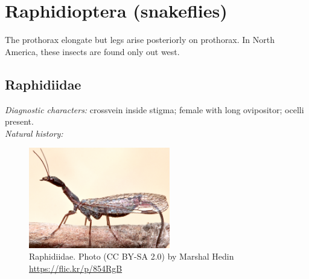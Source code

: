 \documentclass[letterpaper, 11pt]{article}
\begin{document}
\section{Raphidioptera (snakeflies)}
The prothorax elongate but legs arise posteriorly on prothorax. In North America, these insects are found only out west.\\

\subsection{Raphidiidae}
\noindent{}\textit{Diagnostic characters:} crossvein inside stigma; female with long ovipositor; ocelli present.\\

\noindent{}\textit{Natural history:}\\

\begin{figure}[ht!]
  \centering
    \includegraphics[width=0.55\textwidth]{RaphidiidHabitus}
  \caption{Raphidiidae. Photo (CC BY-SA 2.0) by Marshal Hedin \url{https://flic.kr/p/854RgB}}
  \label{fig:raphid}
\end{figure}

\FloatBarrier


\end{document}
